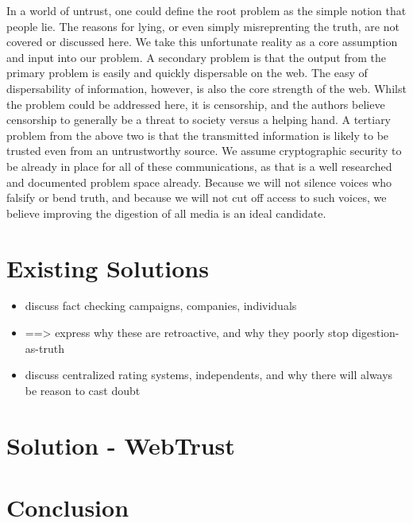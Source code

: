 \documentclass{paper}
\begin{document}
In a world of untrust, one could define the root problem as the simple notion
that people lie.  The reasons for lying, or even simply misreprenting the
truth, are not covered or discussed here.  We take this unfortunate reality as
a core assumption and input into our problem.  A secondary problem is that the
output from the primary problem is easily and quickly dispersable on the web.
The easy of dispersability of information, however, is also the core strength of
the web.  Whilst the problem could be addressed here, it is censorship, and the
authors believe censorship to generally be a threat to society versus a helping
hand.  A tertiary problem from the above two is that the transmitted information
is likely to be trusted even from an untrustworthy source.  We assume
cryptographic security to be already in place for all of these communications,
as that is a well researched and documented problem space already.  Because we
will not silence voices who falsify or bend truth, and because we will not
cut off access to such voices, we believe improving the digestion of all
media is an ideal candidate.

\section{Existing Solutions}

\begin{itemize}
  \item discuss fact checking campaigns, companies, individuals
  \item ==> express why these are retroactive, and why they poorly stop digestion-as-truth
  \item discuss centralized rating systems, independents, and why there will always be reason to cast doubt
\end{itemize}

\section{Solution - WebTrust}

\section{Conclusion}

\subsection{}
\subsubsection{}

\paragraph{}
\subparagraph{}
\end{document}
